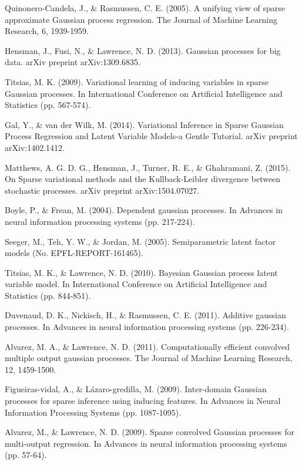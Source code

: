 \begin{thebibliography}{99}
 Quinonero-Candela, J., \& Rasmussen, C. E. (2005). A unifying
view of sparse approximate Gaussian process regression. The Journal of
Machine Learning Research, 6, 1939-1959.

 Hensman, J., Fusi, N., \& Lawrence, N. D. (2013). Gaussian
processes for big data. arXiv preprint arXiv:1309.6835.

 Titsias, M. K. (2009). Variational learning of inducing
variables in sparse Gaussian processes. In International Conference on
Artificial Intelligence and Statistics (pp. 567-574).

 Gal, Y., \& van der Wilk, M. (2014). Variational Inference in
Sparse Gaussian Process Regression and Latent Variable Models-a Gentle
Tutorial. arXiv preprint arXiv:1402.1412.

 Matthews, A. G. D. G., Hensman, J., Turner, R. E., \&
Ghahramani, Z. (2015). On Sparse variational methods and the
Kullback-Leibler divergence between stochastic processes. arXiv preprint
arXiv:1504.07027.

 Boyle, P., \& Frean, M. (2004). Dependent gaussian processes.
In Advances in neural information processing systems (pp. 217-224).

 Seeger, M., Teh, Y. W., \& Jordan, M. (2005). Semiparametric
latent factor models (No. EPFL-REPORT-161465).

 Titsias, M. K., \& Lawrence, N. D. (2010). Bayesian Gaussian
process latent variable model. In International Conference on Artificial
Intelligence and Statistics (pp. 844-851).

 Duvenaud, D. K., Nickisch, H., \& Rasmussen, C. E. (2011).
Additive gaussian processes. In Advances in neural information processing
systems (pp. 226-234).

 Alvarez, M. A., \& Lawrence, N. D. (2011). Computationally
efficient convolved multiple output gaussian processes. The Journal of
Machine Learning Research, 12, 1459-1500.

 Figueiras-vidal, A., \& L\'{a}zaro-gredilla, M. (2009).
Inter-domain Gaussian processes for sparse inference using inducing
features. In Advances in Neural Information Processing Systems (pp.
1087-1095).

 Alvarez, M., \& Lawrence, N. D. (2009). Sparse convolved
Gaussian processes for multi-output regression. In Advances in neural
information processing systems (pp. 57-64).


\end{thebibliography}
